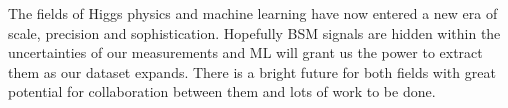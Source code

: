 The fields of Higgs physics and machine learning have now entered a new era of scale, precision and sophistication.
Hopefully BSM signals are hidden within the uncertainties of our measurements and ML will grant us the power to extract them as our dataset expands.
There is a bright future for both fields with great potential for collaboration between them and lots of work to be done. 









